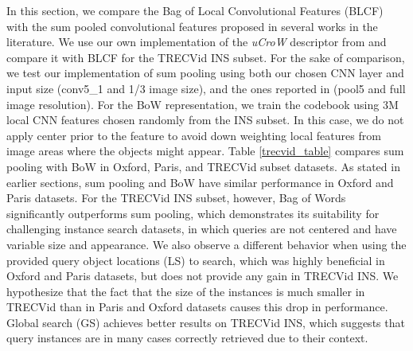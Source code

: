 \documentclass{sig-arxiv}
\begin{document}
In this section, we compare the Bag of Local Convolutional Features (BLCF) with the sum pooled convolutional features proposed in several works in the literature. We use our own implementation of the \emph{uCroW} descriptor from \cite{kalantidis2015} and compare it with BLCF for the TRECVid INS subset. For the sake of comparison, we test our implementation of sum pooling using both our chosen CNN layer and input size (conv5\_1 and 1/3 image size), and the ones reported in \cite{kalantidis2015} (pool5 and full image resolution). For the BoW representation, we train the codebook using 3M local CNN features chosen randomly from the INS subset. In this case, we do not apply center prior to the feature to avoid down weighting local features from image areas where the objects might appear. Table \ref{trecvid_table} compares sum pooling with BoW in Oxford, Paris, and TRECVid subset datasets. As stated in earlier sections, sum pooling and BoW have similar performance in Oxford and Paris datasets. For the TRECVid INS subset, however, Bag of Words significantly outperforms sum pooling, which demonstrates its suitability for challenging instance search datasets, in which queries are not centered and have variable size and appearance.  We also observe a different behavior when using the provided query object locations (LS) to search, which was highly beneficial in Oxford and Paris datasets, but does not provide any gain in TRECVid INS. We hypothesize that the fact that the size of the instances is much smaller in TRECVid than in Paris and Oxford datasets causes this drop in performance. Global search (GS) achieves better results on TRECVid INS, which suggests that query instances are in many cases correctly retrieved due to their context. 
\end{document}
